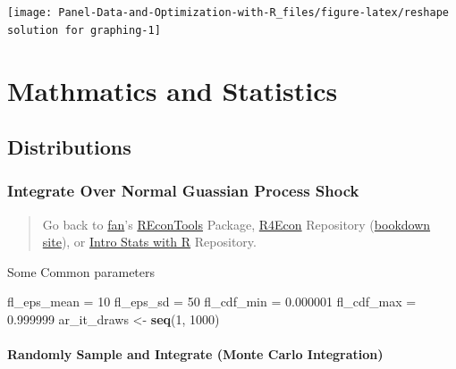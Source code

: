 \documentclass[
]{book}
\newenvironment{Shaded}{\begin{snugshade}}{\end{snugshade}}
\newcommand{\DecValTok}[1]{\textcolor[rgb]{0.00,0.00,0.81}{#1}}
\newcommand{\FloatTok}[1]{\textcolor[rgb]{0.00,0.00,0.81}{#1}}
\newcommand{\KeywordTok}[1]{\textcolor[rgb]{0.13,0.29,0.53}{\textbf{#1}}}
\newcommand{\NormalTok}[1]{#1}
\newcommand{\StringTok}[1]{\textcolor[rgb]{0.31,0.60,0.02}{#1}}
\begin{document}
\begin{center}\texttt{[image: Panel-Data-and-Optimization-with-R\_files/figure-latex/reshape solution for graphing-1]} \end{center}

\hypertarget{mathmatics-and-statistics}{%
\chapter{Mathmatics and Statistics}\label{mathmatics-and-statistics}}

\hypertarget{distributions}{%
\section{Distributions}\label{distributions}}

\hypertarget{integrate-over-normal-guassian-process-shock}{%
\subsection{Integrate Over Normal Guassian Process Shock}\label{integrate-over-normal-guassian-process-shock}}

\begin{quote}
Go back to \href{http://fanwangecon.github.io/}{fan}'s \href{https://fanwangecon.github.io/REconTools/}{REconTools} Package, \href{https://fanwangecon.github.io/R4Econ/}{R4Econ} Repository (\href{https://fanwangecon.github.io/R4Econ/bookdown}{bookdown site}), or \href{https://fanwangecon.github.io/Stat4Econ/}{Intro Stats with R} Repository.
\end{quote}

Some Common parameters

\begin{Shaded}
\begin{Highlighting}[]
\NormalTok{fl_eps_mean =}\StringTok{ }\DecValTok{10}
\NormalTok{fl_eps_sd =}\StringTok{ }\DecValTok{50}
\NormalTok{fl_cdf_min =}\StringTok{ }\FloatTok{0.000001}
\NormalTok{fl_cdf_max =}\StringTok{ }\FloatTok{0.999999}
\NormalTok{ar_it_draws <-}\StringTok{ }\KeywordTok{seq}\NormalTok{(}\DecValTok{1}\NormalTok{, }\DecValTok{1000}\NormalTok{)}
\end{Highlighting}
\end{Shaded}

\hypertarget{randomly-sample-and-integrate-monte-carlo-integration}{%
\subsubsection{Randomly Sample and Integrate (Monte Carlo Integration)}\label{randomly-sample-and-integrate-monte-carlo-integration}}
\end{document}
